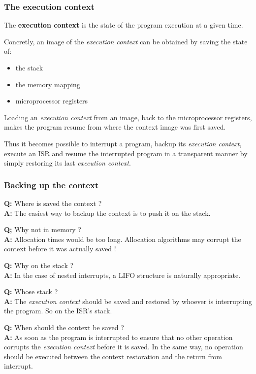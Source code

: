 \begin{frame}
  \frametitle{The execution context}

  The {\bf execution context} is the state of the program execution at a given
  time.

  \-

  Concretly, an image of the {\em execution context} can be obtained by saving
  the state of:

  \begin{itemize}
    \item the stack
    \item the memory mapping
    \item microprocessor registers
  \end{itemize}

  \-

  Loading an {\em execution context} from an image, back to the microprocessor
  registers, makes the program resume from where the context image was first
  saved.

  \-

  Thus it becomes possible to interrupt a program, backup its {\em execution
  context}, execute an ISR and resume the interrupted program in a transparent
  manner by simply restoring its last {\em execution context}.

\end{frame}

%
%
%

\begin{frame}
  \frametitle{Backing up the context}

  {\bf Q:} Where is saved the context ?\\
  {\bf A:} The easiest way to backup the context is to push it on the stack.

  \-

  {\bf Q;} Why not in memory ?\\
  {\bf A:} Allocation times would be too long. Allocation algorithms may
  corrupt the context before it was actually saved !

  \-

  {\bf Q:} Why on the stack ?\\
  {\bf A:} In the case of nested interrupts, a LIFO structure is naturally
  appropriate.

  \-

  {\bf Q:} Whose stack ?\\
  {\bf A:} The {\em execution context} should be saved and restored by whoever is
  interrupting the program. So on the ISR's stack.

  \-

  {\bf Q:} When should the context be saved ?\\
  {\bf A:} As soon as the program is interrupted to ensure that no other
  operation corrupts the {\em execution context} before it is saved. In the same
  way, no operation should be executed between the context restoration and the
  return from interrupt.

\end{frame}

